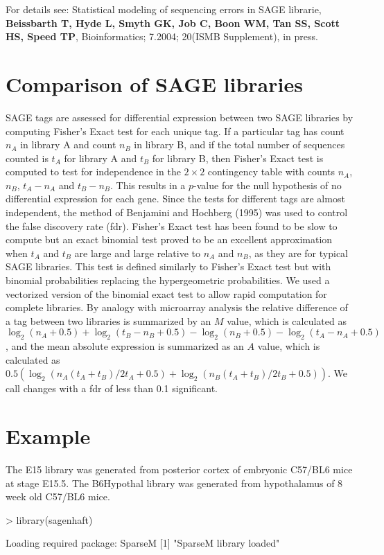 \documentclass[12pt]{article}
\begin{document}
For details see: Statistical modeling of sequencing errors in SAGE librarie,
\textbf{Beissbarth T, Hyde L, Smyth GK, Job C, Boon WM, Tan SS, Scott HS, Speed TP},
Bioinformatics; 7.2004; 20(ISMB Supplement), in press.

\section{Comparison of SAGE libraries}

SAGE tags are assessed for differential expression between two SAGE libraries by
computing Fisher's Exact test for each unique tag. If a particular tag has count
$n_A$ in library A and count $n_B$ in library B, and if the total number of
sequences counted is $t_A$ for library A and $t_B$ for library B, then Fisher's
Exact test is computed to test for independence in the $2 \times 2$ contingency
table with counts $n_A$, $n_B$, $t_A - n_A$ and $t_B - n_B$. This results in a
$p$-value for the null hypothesis of no differential expression for each
gene. Since the tests for different tags are almost independent, the method of
Benjamini and Hochberg (1995) was used to control the false discovery rate
(fdr). Fisher's Exact test has been found to be slow to compute but an exact
binomial test proved to be an excellent approximation when $t_A$ and $t_B$ are
large and large relative to $n_A$ and $n_B$, as they are for typical SAGE
libraries. This test is defined similarly to Fisher's Exact test but with
binomial probabilities replacing the hypergeometric probabilities. We used a
vectorized version of the binomial exact test to allow rapid computation for
complete libraries. By analogy with microarray analysis the relative difference
of a tag between two libraries is summarized by an $M$ value, which is
calculated as
$\log_2(n_A+0.5)+\log_2(t_B-n_B+0.5)-\log_2(n_B+0.5)-\log_2(t_A-n_A+0.5)$, and
the mean absolute expression is summarized as an $A$ value, which is calculated
as $0.5 (\log_2(n_A (t_A+t_B)/2t_A + 0.5) + \log_2(n_B(t_A+t_B)/2t_B +0.5))$. We
call changes with a fdr of less than 0.1 significant.

\section{Example}

The E15 library was generated from posterior cortex of embryonic C57/BL6 mice at
stage E15.5. The B6Hypothal library was generated from hypothalamus of 8 week
old C57/BL6 mice.

\begin{Schunk}
\begin{Sinput}
> library(sagenhaft)
\end{Sinput}
\begin{Soutput}
Loading required package: SparseM
[1] "SparseM library loaded"

\end{Soutput}
\end{Schunk}
\end{document}
